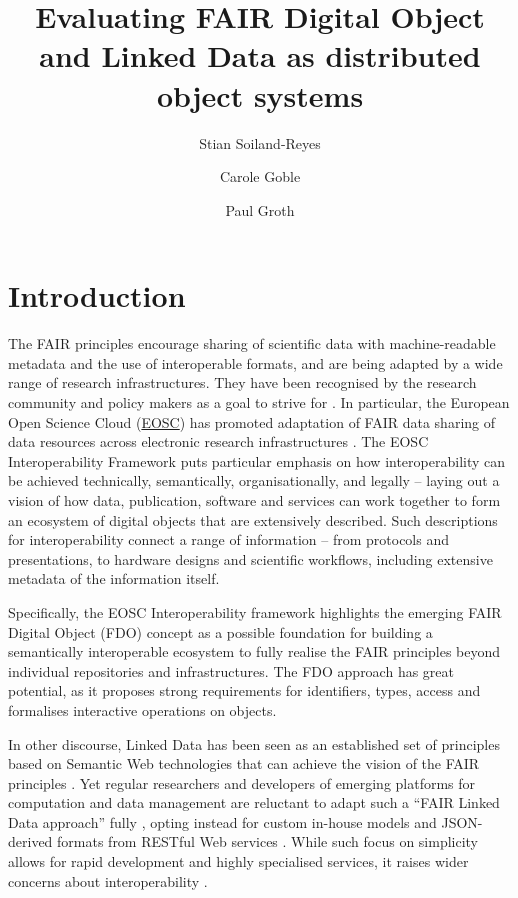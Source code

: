 \documentclass[fleqn,10pt,lineno]{wlpeerjlua}
\title{Evaluating FAIR Digital Object and Linked Data as distributed object systems}
\author[1,2]{Stian Soiland-Reyes} %
\author[1]{Carole Goble}          %
\author[2]{Paul Groth}            %
\affil[1]{Department of Computer Science, The University of Manchester, UK}
\affil[2]{Informatics Institute, Faculty of Science, University of Amsterdam, NL }
\begin{document}
\flushbottom
\maketitle
\thispagestyle{empty}


\section*{Introduction}\label{sec:introduction}

The FAIR principles \autocite{wilkinsonFAIRGuidingPrinciples2016e} encourage sharing of scientific data with machine-readable metadata and the use of interoperable formats, and are being adapted by a wide range of research infrastructures. They have been recognised by the research community and policy makers as a goal to strive for \autocite{h2020fair2016}. In particular, the European Open Science Cloud (\href{https://www.eosc.eu/}{EOSC}) has promoted adaptation of FAIR data sharing of data resources across electronic research infrastructures \autocite{monsCloudyIncreasinglyFAIR2017b}. The EOSC Interoperability Framework \autocite{corchoEOSCInteroperabilityFramework2021b} puts particular emphasis on how interoperability can be achieved technically, semantically, organisationally, and legally -- laying out a vision of how data, publication, software and services can work together to form an ecosystem of digital objects that are extensively described. Such descriptions for interoperability connect a range of information -- from protocols and presentations, to hardware designs and scientific workflows, including extensive metadata of the information itself.

Specifically, the EOSC Interoperability framework highlights the emerging FAIR Digital Object (FDO) concept \autocite{schultesFAIRPrinciplesDigital2019a} as a possible foundation for building a semantically interoperable ecosystem to fully realise the FAIR principles beyond individual repositories and infrastructures. The FDO approach has great potential, as it proposes strong requirements for identifiers, types, access and formalises interactive operations on objects.

In other discourse, Linked Data \autocite{bizerLinkedDataStory2009a} has been seen as an established set of principles based on Semantic Web technologies that can achieve the vision of the FAIR principles \autocite{boninodasilvasantosFAIRDataPoints2016a,hasnainAssessingFAIRData2018a}. Yet regular researchers and developers of emerging platforms for computation and data management are reluctant to adapt such a ``FAIR Linked Data approach'' fully \autocite{verborghSemanticWebIdentity2020a}, opting instead for custom in-house models and JSON-derived formats from RESTful Web services \autocite{merono-penuelaConclusionFutureChallenges2021a,neumannAnalysisPublicREST2021a}. While such focus on simplicity allows for rapid development and highly specialised services, it raises wider concerns about interoperability \autocite{turcoaneLinkedDataJSONLD2014a,wilkinsonWorkflowsWhenParts2022b}.
\end{document}

